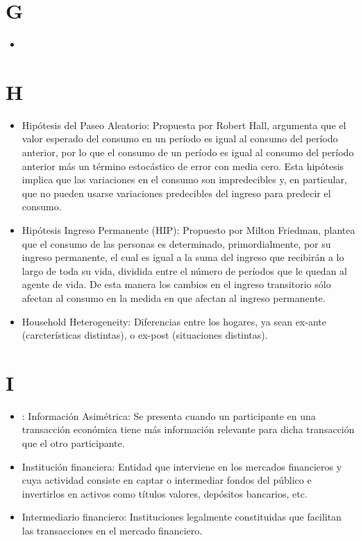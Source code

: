 \documentclass{article}
\begin{document}
\section{G}
\begin{itemize}

\item

\end{itemize}

\section{H}
\begin{itemize}

\item Hipótesis del Paseo Aleatorio: Propuesta por Robert Hall, argumenta que el valor esperado del consumo en un período es igual al consumo del período anterior, por lo que el consumo de un período es igual al consumo del período anterior más un término estocástico de error con media cero. Esta hipótesis implica que las variaciones en el consumo son impredecibles y, en particular, que no pueden usarse variaciones predecibles del ingreso para predecir el consumo. 

\item Hipótesis Ingreso Permanente (HIP): Propuesto por Milton Friedman, plantea que el consumo de las personas es determinado, primordialmente, por su ingreso permanente, el cual es igual a la suma del ingreso que recibirán a lo largo de toda su vida, dividida entre el número de períodos que le quedan al agente de vida. De esta manera los cambios en el ingreso transitorio sólo afectan al consumo en la medida en que afectan al ingreso permanente. 

\item Household Heterogeneity: Diferencias entre los hogares, ya sean ex-ante (carcterísticas distintas), o ex-post (situaciones distintas).

\end{itemize}

\section{I}
\begin{itemize}

\item: Información Asimétrica: Se presenta cuando un participante en una transacción económica tiene más información relevante para dicha transacción que el otro participante.

\item Institución financiera: Entidad que interviene en los mercados financieros y cuya actividad consiste en captar o intermediar fondos del público e invertirlos en activos como títulos valores, depósitos bancarios, etc.

\item Intermediario financiero: Instituciones legalmente constituidas que facilitan las transacciones en el mercado financiero.

\end{itemize}
\end{document}
